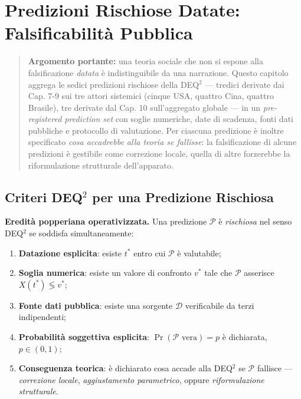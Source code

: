 \chapter{Predizioni Rischiose Datate: Falsificabilità
Pubblica}\label{predizioni-rischiose-datate-falsificabilituxe0-pubblica}

\begin{quote}
\textbf{Argomento portante:} una teoria sociale che non si espone alla
falsificazione \emph{datata} è indistinguibile da una narrazione. Questo
capitolo aggrega le sedici predizioni rischiose della DEQ$^2$ --- tredici
derivate dai Cap. 7-9 sui tre attori sistemici (cinque USA, quattro
Cina, quattro Brasile), tre derivate dal Cap. 10 sull'aggregato globale
--- in un \emph{pre-registered prediction set} con soglie numeriche,
date di scadenza, fonti dati pubbliche e protocollo di valutazione. Per
ciascuna predizione è inoltre specificato \emph{cosa accadrebbe alla
teoria se fallisse}: la falsificazione di alcune predizioni è gestibile
come correzione locale, quella di altre forzerebbe la riformulazione
strutturale dell'apparato.
\end{quote}



\section{Criteri DEQ$^2$ per una Predizione
Rischiosa}\label{criteri-dequxb2-per-una-predizione-rischiosa}

\Hypoth{} \textbf{Eredità popperiana operativizzata.} Una predizione
\(\mathcal{P}\) è \emph{rischiosa} nel senso DEQ$^2$ se soddisfa
simultaneamente:

\begin{enumerate}
\def\labelenumi{\arabic{enumi}.}
\tightlist
\item
  \textbf{Datazione esplicita}: esiste \(t^*\) entro cui \(\mathcal{P}\)
  è valutabile;
\item
  \textbf{Soglia numerica}: esiste un valore di confronto \(v^*\) tale
  che \(\mathcal{P}\) asserisce \(X(t^*) \lessgtr v^*\);
\item
  \textbf{Fonte dati pubblica}: esiste una sorgente \(\mathcal{D}\)
  verificabile da terzi indipendenti;
\item
  \textbf{Probabilità soggettiva esplicita}:
  \(\Pr(\mathcal{P} \text{ vera}) = p\) è dichiarata, \(p \in (0, 1)\);
\item
  \textbf{Conseguenza teorica}: è dichiarato cosa accade alla DEQ$^2$ se
  \(\mathcal{P}\) fallisce --- \emph{correzione locale},
  \emph{aggiustamento parametrico}, oppure \emph{riformulazione
  strutturale}.
\end{enumerate}

